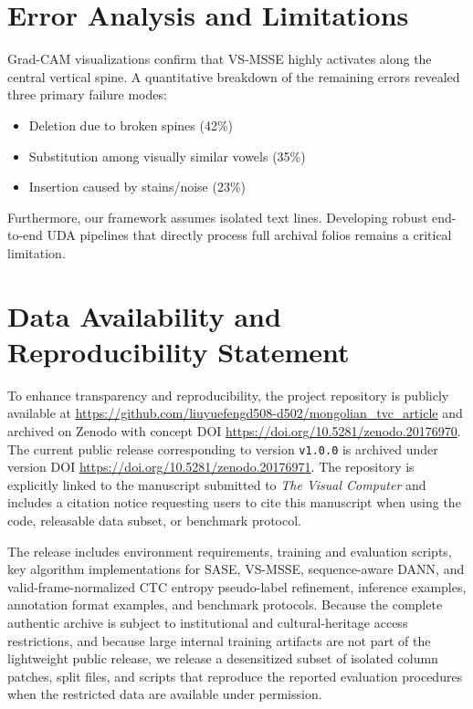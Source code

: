 \documentclass[pdflatex,sn-mathphys-num]{sn-jnl}
\begin{document}
\section{Error Analysis and Limitations}
Grad-CAM visualizations confirm that VS-MSSE highly activates along the central vertical spine. A quantitative breakdown of the remaining errors revealed three primary failure modes:
\begin{itemize}[noitemsep,topsep=0pt]
    \item Deletion due to broken spines (42\%)
    \item Substitution among visually similar vowels (35\%)
    \item Insertion caused by stains/noise (23\%)
\end{itemize}
Furthermore, our framework assumes isolated text lines. Developing robust end-to-end UDA pipelines that directly process full archival folios remains a critical limitation.

\section{Data Availability and Reproducibility Statement}
To enhance transparency and reproducibility, the project repository is publicly available at \url{https://github.com/liuyuefengd508-d502/mongolian_tvc_article} and archived on Zenodo with concept DOI \url{https://doi.org/10.5281/zenodo.20176970}. The current public release corresponding to version \texttt{v1.0.0} is archived under version DOI \url{https://doi.org/10.5281/zenodo.20176971}. The repository is explicitly linked to the manuscript submitted to \textit{The Visual Computer} and includes a citation notice requesting users to cite this manuscript when using the code, releasable data subset, or benchmark protocol.

The release includes environment requirements, training and evaluation scripts, key algorithm implementations for SASE, VS-MSSE, sequence-aware DANN, and valid-frame-normalized CTC entropy pseudo-label refinement, inference examples, annotation format examples, and benchmark protocols. Because the complete authentic archive is subject to institutional and cultural-heritage access restrictions, and because large internal training artifacts are not part of the lightweight public release, we release a desensitized subset of isolated column patches, split files, and scripts that reproduce the reported evaluation procedures when the restricted data are available under permission.
\end{document}
